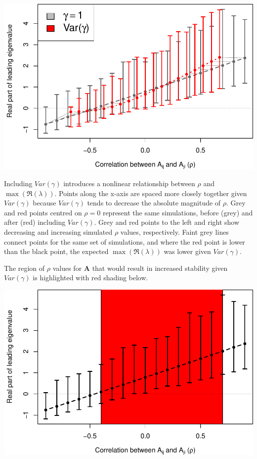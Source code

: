 \documentclass[]{article}
\begin{document}
\includegraphics{revision_notes_files/figure-latex/unnamed-chunk-11-1.pdf}

Including \(Var(\gamma)\) introduces a nonlinear relationship between
\(\rho\) and \(\max(\Re(\lambda))\). Points along the x-axis are spaced
more closely together given \(Var(\gamma)\) because \(Var(\gamma)\)
tends to decrease the absolute magnitude of \(\rho\). Grey and red
points centred on \(\rho = 0\) represent the same simulations, before
(grey) and after (red) including \(Var(\gamma)\). Grey and red points to
the left and right show decreasing and increasing simulated \(\rho\)
values, respectively. Faint grey lines connect points for the same set
of simulations, and where the red point is lower than the black point,
the expected \(\max(\Re(\lambda))\) was lower given \(Var(\gamma)\).

The region of \(\rho\) values for \(\textbf{A}\) that would result in
increased stability given \(Var(\gamma)\) is highlighted with red
shading below.

\includegraphics{revision_notes_files/figure-latex/unnamed-chunk-12-1.pdf}
\end{document}
